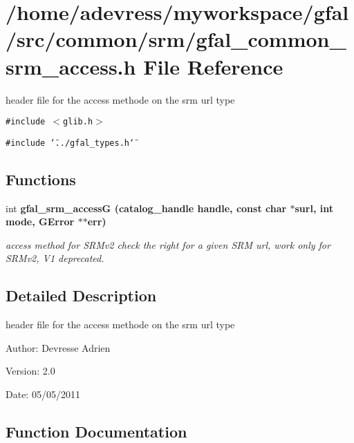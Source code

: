 \section{/home/adevress/myworkspace/gfal/src/common/srm/gfal\_\-common\_\-srm\_\-access.h File Reference}
\label{gfal__common__srm__access_8h}
header file for the access methode on the srm url type 

{\tt \#include $<$glib.h$>$}\par
{\tt \#include \char`\"{}../gfal\_\-types.h\char`\"{}}\par
\subsection*{Functions}
\begin{CompactItemize}
\item 
int \bf{gfal\_\-srm\_\-access\-G} (catalog\_\-handle handle, const char $\ast$surl, int mode, GError $\ast$$\ast$err)
\begin{CompactList}\small\item\em access method for SRMv2 check the right for a given SRM url, work only for SRMv2, V1 deprecated. \item\end{CompactList}\end{CompactItemize}


\subsection{Detailed Description}
header file for the access methode on the srm url type 

\begin{Desc}
\item[Author:]Devresse Adrien \end{Desc}
\begin{Desc}
\item[Version:]2.0 \end{Desc}
\begin{Desc}
\item[Date:]05/05/2011 \end{Desc}


\subsection{Function Documentation}
